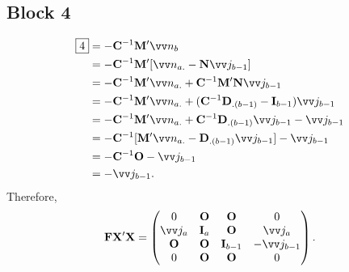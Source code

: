 \subsection*{Block 4}
\begin{align*}
    \boxed{4}
     & =-\Matrix{C}^{-1}\Matrix{M}'\Vector{n}_{b}                                                                        \\
     & =-\Matrix{C}^{-1}\Matrix{M}'[\Vector{n}_{a.}-\Matrix{N}\Vector{j}_{b-1}]                                          \\
     & =-\Matrix{C}^{-1}\Matrix{M}'\Vector{n}_{a.}+\Matrix{C}^{-1}\Matrix{M}'\Matrix{N}\Vector{j}_{b-1}                  \\
     & =-\Matrix{C}^{-1}\Matrix{M}'\Vector{n}_{a.}+(\Matrix{C}^{-1}\Matrix{D}_{.(b-1)}-\Matrix{I}_{b-1})\Vector{j}_{b-1} \\
     & =-\Matrix{C}^{-1}\Matrix{M}'\Vector{n}_{a.}+\Matrix{C}^{-1}\Matrix{D}_{.(b-1)}\Vector{j}_{b-1}-\Vector{j}_{b-1}   \\
     & =-\Matrix{C}^{-1}[\Matrix{M}'\Vector{n}_{a.}-\Matrix{D}_{.(b-1)}\Vector{j}_{b-1}]-\Vector{j}_{b-1}                \\
     & =-\Matrix{C}^{-1}\Matrix{O}-\Vector{j}_{b-1}                                                                      \\
     & =-\Vector{j}_{b-1}.
\end{align*}
Therefore,
\[ \Matrix{F}\Matrix{X}'\Matrix{X}
    =\begin{pmatrix}
        0            & \Matrix{O}   & \Matrix{O}       & 0                 \\
        \Vector{j}_a & \Matrix{I}_a & \Matrix{O}       & \Vector{j}_a      \\
        \Matrix{O}   & \Matrix{O}   & \Matrix{I}_{b-1} & -\Vector{j}_{b-1} \\
        0            & \Matrix{O}   & \Matrix{O}       & 0
    \end{pmatrix}. \]
